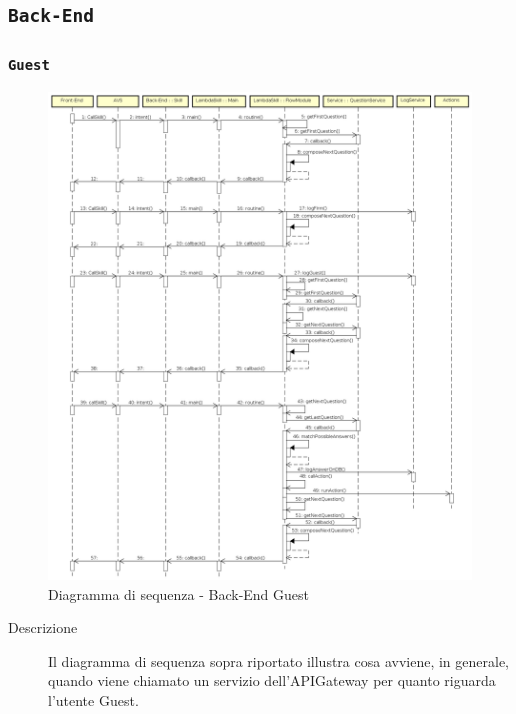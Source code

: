 \documentclass[../DefinizioneDiProdotto_v2.0.0.tex]{subfiles}
\begin{document}
\newpage
\subsection{\texttt{Back-End}}
\subsubsection{\texttt{Guest}}
\begin{figure}[!h]
	\centering
	\includegraphics[width=\textwidth]{DiagrammiSequenza/Back-End/DiagrammaSequenzaBackendGuest.png}
	\caption{Diagramma di sequenza - Back-End Guest }
\end{figure}
\begin{description}
	\item [Descrizione] Il diagramma di sequenza sopra riportato illustra cosa avviene, in generale, quando viene chiamato un servizio dell'APIGateway per quanto riguarda l'utente Guest.
\end{description}

\newpage
\end{document}
